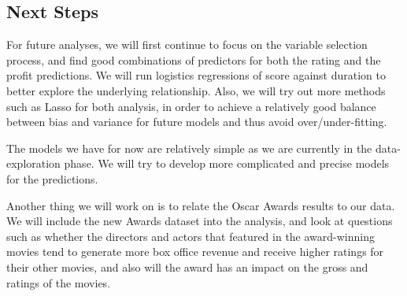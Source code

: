 \documentclass[12pt]{article}
\begin{document}
\begin{multicols}{2}
\section{Next Steps}
\bigskip
For future analyses, we will first continue to focus on the variable selection process, and find good combinations of predictors for both the rating and the profit predictions. We will run logistics regressions of score against duration to better explore the underlying relationship. Also, we will try out more methods such as Lasso for both analysis, in order to achieve a relatively good balance between bias and variance for future models and thus avoid over/under-fitting. \par
The models we have for now are relatively simple as we are currently in the data-exploration phase. We will try to develop more complicated and precise models for the predictions.\par
Another thing we will work on is to relate the Oscar Awards results to our data. We will include the new Awards dataset into the analysis, and look at questions such as whether the directors and actors that featured in the award-winning movies tend to generate more box office revenue and receive higher ratings for their other movies, and also will the award has an impact on the gross and ratings of the movies.

\end{multicols}
\end{document}
